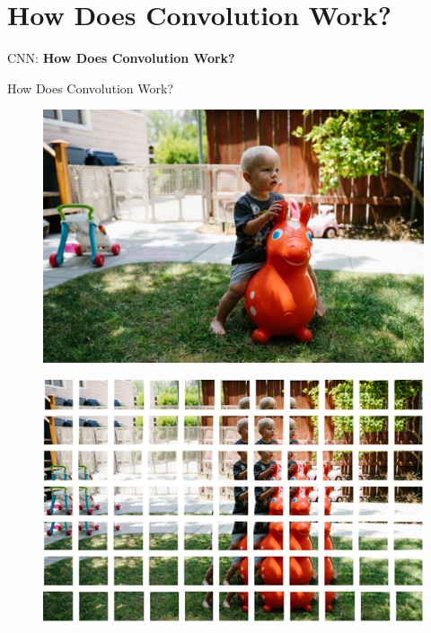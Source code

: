 \section{How Does Convolution Work?}
\begin{frame}{}
    \LARGE CNN: \textbf{How Does Convolution Work?}
\end{frame}

\begin{frame}[allowframebreaks]{How Does Convolution Work?}

\begin{figure}
\centering
\includegraphics[width=1.0\textwidth,height=0.9\textheight,keepaspectratio]{images/cnn/conv_2.png}
\end{figure}

\framebreak

\begin{figure}
\centering
\includegraphics[width=1.0\textwidth,height=0.9\textheight,keepaspectratio]{images/cnn/conv_3.png}
\end{figure}


\end{frame}
